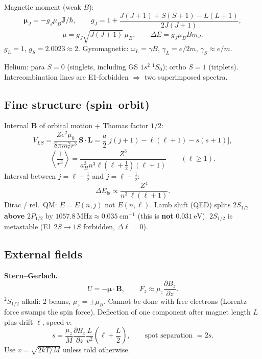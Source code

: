 \documentclass[11pt,a4paper]{article}
\begin{document}
Magnetic moment (weak \(B\)):
\[
\boldsymbol{\mu}_J=-g_J\mu_B\mathbf{J}/\hbar,\qquad
g_J=1+\frac{J(J+1)+S(S+1)-L(L+1)}{2J(J+1)},
\]
\[
\mu=g_J\sqrt{J(J+1)}\,\mu_B,\qquad
\Delta E=g_J\mu_B B m_J.
\]
\(g_L=1\), \(g_S=2.0023\approx 2\). Gyromagnetic: \(\omega_L=\gamma B\), \(\gamma_L=e/2m\), \(\gamma_S\approx e/m\).

Helium: para \(S=0\) (singlets, including GS \(1s^2\;{}^1S_0\)); ortho \(S=1\) (triplets). Intercombination lines are E1-forbidden \(\Rightarrow\) two superimposed spectra.

\subsection{Fine structure (spin--orbit)}
Internal \(\mathbf{B}\) of orbital motion + Thomas factor \(1/2\):
\[
V_{LS}=\frac{Ze^2\mu_0}{8\pi m_e^2 r^3}\,\mathbf{S}\cdot\mathbf{L}
=\frac{a}{2}\bigl[j(j+1)-\ell(\ell+1)-s(s+1)\bigr],
\]
\[
\left\langle\frac1{r^3}\right\rangle=\frac{Z^3}{a_H^3 n^3 \ell(\ell+\tfrac12)(\ell+1)}\qquad(\ell\ge 1).
\]
Interval between \(j=\ell+\tfrac12\) and \(j=\ell-\tfrac12\):
\[
\Delta E_{\mathrm{fs}}\propto\frac{Z^4}{n^3\,\ell(\ell+1)}.
\]
Dirac / rel.\ QM: \(E=E(n,j)\) not \(E(n,\ell)\).
Lamb shift (QED) splits \(2S_{1/2}\) \textbf{above} \(2P_{1/2}\) by \(1057.8~\mathrm{MHz}\approx 0.035~\mathrm{cm}^{-1}\)
(this is \textbf{not} \(0.031~\mathrm{eV}\)).
\(2S_{1/2}\) is metastable (E1 \(2S\to 1S\) forbidden, \(\Delta\ell=0\)).

\subsection{External fields}

\textbf{Stern--Gerlach.}
\[
U=-\boldsymbol{\mu}\cdot\mathbf{B},\qquad
F_z\approx\mu_z\frac{\partial B_z}{\partial z}.
\]
\(^{2}S_{1/2}\) alkali: 2 beams, \(\mu_z=\pm\mu_B\). Cannot be done with free electrons (Lorentz force swamps the spin force).
Deflection of one component after magnet length \(L\) plus drift \(\ell\), speed \(v\):
\[
s=\frac{\mu_z}{M}\frac{\partial B_z}{\partial z}\frac{L}{v^2}\left(\ell+\frac{L}{2}\right),\qquad
\text{spot separation }=2s.
\]
Use \(v=\sqrt{2kT/M}\) unless told otherwise.
\end{document}

